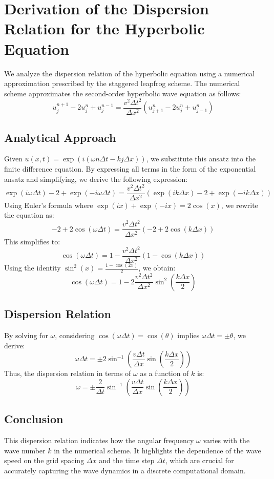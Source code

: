 \documentclass{article}
\begin{document}
\section{Derivation of the Dispersion Relation for the Hyperbolic Equation}
We analyze the dispersion relation of the hyperbolic equation using a numerical approximation prescribed by the staggered leapfrog scheme. The numerical scheme approximates the second-order hyperbolic wave equation as follows:
\[
u_j^{n+1} - 2u_j^n + u_j^{n-1} = \frac{v^2 \Delta t^2}{\Delta x^2} \left(u_{j+1}^n - 2u_j^n + u_{j-1}^n\right)
\]

\subsection{Analytical Approach}
Given \( u(x,t) = \exp(i(\omega n\Delta t - k j\Delta x)) \), we substitute this ansatz into the finite difference equation. By expressing all terms in the form of the exponential ansatz and simplifying, we derive the following expression:
\[
\exp(i\omega\Delta t) - 2 + \exp(-i\omega\Delta t) = \frac{v^2 \Delta t^2}{\Delta x^2} \left(\exp(ik\Delta x) - 2 + \exp(-ik\Delta x)\right)
\]
Using Euler's formula where \( \exp(ix) + \exp(-ix) = 2\cos(x) \), we rewrite the equation as:
\[
-2 + 2\cos(\omega\Delta t) = \frac{v^2 \Delta t^2}{\Delta x^2} \left(-2 + 2\cos(k\Delta x)\right)
\]
This simplifies to:
\[
\cos(\omega\Delta t) = 1 - \frac{v^2 \Delta t^2}{\Delta x^2} \left(1 - \cos(k\Delta x)\right)
\]
Using the identity \( \sin^2(x) = \frac{1 - \cos(2x)}{2} \), we obtain:
\[
\cos(\omega\Delta t) = 1 - 2 \frac{v^2 \Delta t^2}{\Delta x^2} \sin^2\left(\frac{k\Delta x}{2}\right)
\]

\subsection{Dispersion Relation}
By solving for \( \omega \), considering \( \cos(\omega\Delta t) = \cos(\theta) \) implies \( \omega\Delta t = \pm \theta \), we derive:
\[
\omega\Delta t = \pm 2\sin^{-1}\left(\frac{v\Delta t}{\Delta x} \sin\left(\frac{k\Delta x}{2}\right)\right)
\]
Thus, the dispersion relation in terms of \( \omega \) as a function of \( k \) is:
\[
\omega = \pm \frac{2}{\Delta t}\sin^{-1}\left(\frac{v\Delta t}{\Delta x} \sin\left(\frac{k\Delta x}{2}\right)\right)
\]

\subsection{Conclusion}
This dispersion relation indicates how the angular frequency \( \omega \) varies with the wave number \( k \) in the numerical scheme. It highlights the dependence of the wave speed on the grid spacing \( \Delta x \) and the time step \( \Delta t \), which are crucial for accurately capturing the wave dynamics in a discrete computational domain.
\end{document}
